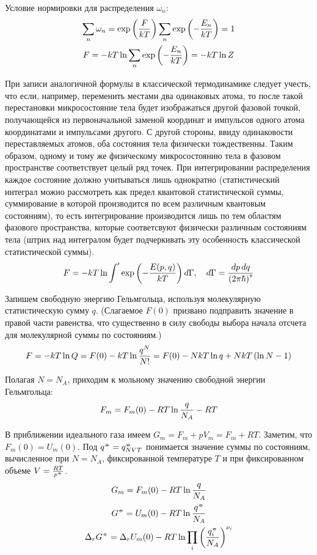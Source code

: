 Условие нормировки для распределения $\omega_n$:
\vverh
\begin{gather}
	\sum_n \omega_n = \exp \left( \frac{F}{kT} \right) \sum_n \exp \left( - \frac{E_n}{kT} \right) = 1 \notag \\
	F = - kT \ln \sum_n \exp \left( - \frac{E_n}{kT} \right) = - kT \ln Z \notag
\end{gather}

При записи аналогичной формулы в классической термодинамике следует учесть, что если, например, переменить местами два одинаковых атома, то после такой перестановки микросостояние тела будет изображаться другой фазовой точкой, получающейся из первоначальной заменой координат и импульсов одного атома координатами и импульсами другого. С другой стороны, ввиду одинаковости переставляемых атомов, оба состояния тела физически тождественны. Таким образом, одному и тому же физическому микросостоянию тела в фазовом пространстве соответствует целый ряд точек. При интегрировании распределения каждое состояние должно учитываться лишь однократно (статистический интеграл можно рассмотреть как предел квантовой статистической суммы, суммирование в которой производится по всем различным квантовым состояниям), то есть интегрирование производится лишь по тем областям фазового пространства, которые соответсвуют физически различным состояниям тела (штрих над интегралом будет подчеркивать эту особенность классической статистической суммы).
\vverh
\begin{gather}
	F = -k T \ln \int^{\prime} \exp \left( - \frac{E(p, q)}{kT} \right) d \Gamma, \quad d \Gamma = \frac{dp \, dq}{\left( 2 \pi \hbar \right)^s} \notag
\end{gather}

Запишем свободную энергию Гельмгольца, используя молекулярную статистическую сумму $q$. (Слагаемое $F(0)$ призвано подправить значение в правой части равенства, что существенно в силу свободы выбора начала отсчета для молекулярной суммы по состояниям.)  
\vverh
\begin{gather}
	F = - k T \ln Q = F(0) - kT \ln \frac{q^N}{N!} = F(0) - NkT \ln q + NkT \left( \ln N - 1 \right) \notag 
\end{gather}

Полагая $N = N_A$, приходим к мольному значению свободной энергии Гельмгольца:
\vverh
\begin{gather}
	F_m = F_m(0) - RT \ln \frac{q}{N_A} - RT \notag
\end{gather}

В приближении идеального газа имеем $G_m = F_m + p V_m = F_m + RT$. Заметим, что $F_m(0) = U_m(0)$. Под $q^{\barcirc} = q_{NVT}^{\barcirc}$ понимается значение суммы по состояниям, вычисленное при $N = N_A$, фиксированной температуре $T$ и при фиксированном объеме $V = \frac{RT}{p^{\barcirc}}$.
\vverh
\begin{gather} 
	G_m = F_m(0) - RT \ln \frac{q}{N_A} \notag \\
	G^{\barcirc} = U_m(0) - RT \ln \frac{q^{\barcirc}}{N_A} \notag \\
	\Delta_r G^{\barcirc} = \Delta_r U_m(0) - RT \ln \prod_{i} \lb \frac{q_i^{\barcirc}}{N_A} \rb ^{\nu_i} \notag
\end{gather}

